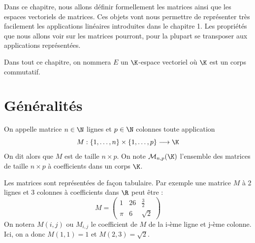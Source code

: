 
\minitoc  %

Dans ce chapitre, nous allons définir formellement les matrices ainsi que les espaces vectoriels de matrices. 
Ces objets vont nous permettre de représenter très facilement les applications linéaires introduites dans le 
chapitre 1. Les propriétés que nous allons voir sur les matrices pourront, pour la plupart se transposer aux applications 
représentées. 

\vspace{0.3cm}

Dans tout ce chapitre, on nommera $E$ un $\K$-espace vectoriel où $\K$ est un corps commutatif. 


\section{Généralités}

\begin{definition}[Matrice]
    On appelle matrice $n \in \N$ lignes et $p \in \N$ colonnes toute application 
        \[ M : \{1, \dots , n\} \times \{1, \dots , p\} \longrightarrow \K \] 
    On dit alors que $M$ est de taille $n \times p$.
    On note $ \mathcal{M}_{n,p}(\K)$ l'ensemble des matrices de taille $n \times p $ à coefficients dans un corps $\K$.  
\end{definition}

\begin{example}
    Les matrices sont représentées de façon tabulaire. 
    Par exemple une matrice $M$ à 2 lignes et 3 colonnes à coefficients dans $\R$ peut être : 
        \[ M = 
            \begin{pmatrix}
                1 & 26 & \frac{3}{2} \\ 
                \pi & 6 & \sqrt{2} 
            \end{pmatrix} \] 
    On notera $M(i,j)$ ou $M_{i,j}$ le coefficient de $M$ de la i-ème ligne et j-ème colonne. 
    Ici, on a donc $M(1,1) = 1$ et $M(2, 3) = \sqrt{2}$. 
\end{example}

